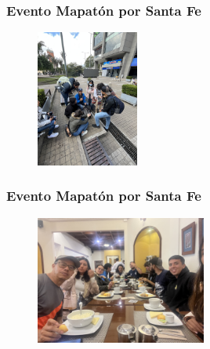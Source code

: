 \documentclass[17pt, t, lualatex]{beamer}
\begin{document}
\begin{frame}
  \frametitle{Evento Mapatón por Santa Fe}

  \begin{figure}
    \centering
    \includegraphics[angle = 270, width=0.3\textwidth]{img/Mapaton1.jpg}
  \end{figure}

\end{frame}

\begin{frame}
  \frametitle{Evento Mapatón por Santa Fe}

  \begin{figure}
    \centering
    \includegraphics[angle = 180, width=0.5\textwidth]{img/Mapaton2.jpg}
  \end{figure}

\end{frame}
\end{document}

